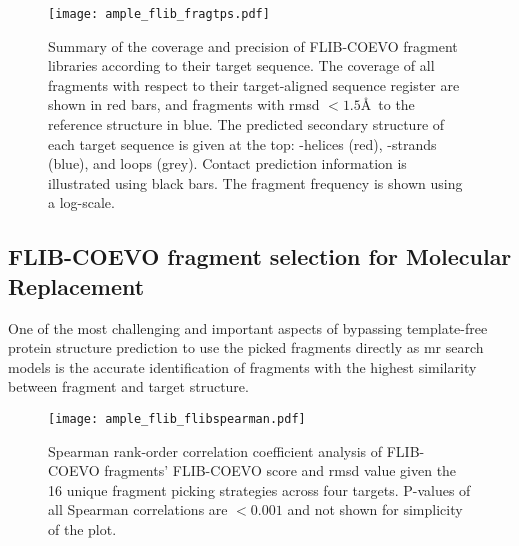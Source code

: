 \begin{figure}[H]
	\centering
	\texttt{[image: ample\_flib\_fragtps.pdf]}
	\caption[Coverage and precision of Flib fragment libraries]{Summary of the coverage and precision of FLIB-COEVO fragment libraries according to their target sequence. The coverage of all fragments with respect to their target-aligned sequence register are shown in red bars, and fragments with \gls{rmsd} $<1.5$\AA\ to the reference structure in blue. The predicted secondary structure of each target sequence is given at the top: \textalpha-helices (red), \textbeta-strands (blue), and loops (grey). Contact prediction information is illustrated using black bars. The fragment frequency is shown using a log-scale.}
	\label{fig:ample_flib_fragtps}
\end{figure}

\subsection{FLIB-COEVO fragment selection for Molecular Replacement}
One of the most challenging and important aspects of bypassing template-free protein structure prediction to use the picked fragments directly as \gls{mr} search models is the accurate identification of fragments with the highest similarity between fragment and target structure.

\begin{figure}[H]
	\centering
	\texttt{[image: ample\_flib\_flibspearman.pdf]}
        \caption[Correlation coefficient analysis of FLIB-COEVO fragments]{Spearman rank-order correlation coefficient analysis of FLIB-COEVO fragments' FLIB-COEVO score and \gls{rmsd} value given the 16 unique fragment picking strategies across four targets. P-values of all Spearman correlations are $<0.001$ and not shown for simplicity of the plot.}
	\label{fig:ample_flib_flibspearman}
\end{figure}

